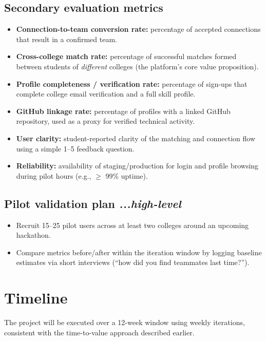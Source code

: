 \documentclass[11pt]{article}
\begin{document}
\subsection{Secondary evaluation metrics}
\begin{itemize}[leftmargin=*]
  \item \textbf{Connection-to-team conversion rate:} percentage of accepted connections that
  result in a confirmed team.
  \item \textbf{Cross-college match rate:} percentage of successful matches formed between
  students of \emph{different} colleges (the platform's core value proposition).
  \item \textbf{Profile completeness / verification rate:} percentage of sign-ups that complete
  college email verification and a full skill profile.
  \item \textbf{GitHub linkage rate:} percentage of profiles with a linked GitHub repository,
  used as a proxy for verified technical activity.
  \item \textbf{User clarity:} student-reported clarity of the matching and connection flow
  using a simple 1--5 feedback question.
  \item \textbf{Reliability:} availability of staging/production for login and profile browsing
  during pilot hours (e.g., $\geq$ 99\% uptime).
\end{itemize}

\subsection{Pilot validation plan \textit{...high-level}}
\begin{itemize}[leftmargin=*]
  \item Recruit 15--25 pilot users across at least two colleges around an upcoming hackathon.
  \item Compare metrics before/after within the iteration window by logging baseline estimates
  via short interviews (``how did you find teammates last time?'').
\end{itemize}

\section{Timeline}
The project will be executed over a 12-week window using weekly iterations, consistent with
the time-to-value approach described earlier.
\end{document}
